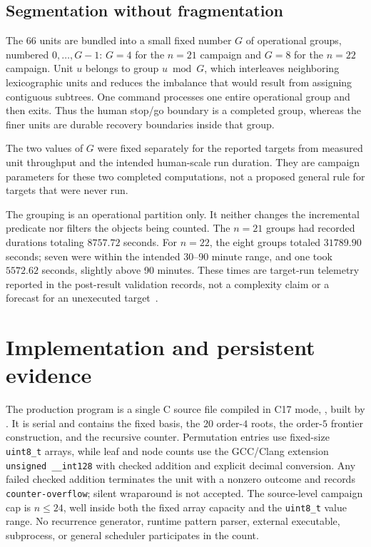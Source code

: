 \documentclass[11pt]{article}
\theoremstyle{definition}
\theoremstyle{remark}
\begin{document}
\subsection{Segmentation without fragmentation}
\label{subsec:groups}

The 66 units are bundled into a small fixed number $G$ of operational groups,
numbered $0,\ldots,G-1$:
$G=4$ for the $n=21$ campaign and $G=8$ for the $n=22$ campaign.  Unit $u$
belongs to group $u\bmod G$, which interleaves neighboring lexicographic units
and reduces the imbalance that would result from assigning contiguous
subtrees.  One command processes one entire operational group and then exits.
Thus the human stop/go boundary is a completed group, whereas the finer units
are durable recovery boundaries inside that group.

The two values of $G$ were fixed separately for the reported targets from
measured unit throughput and the intended human-scale run duration.  They are
campaign parameters for these two completed computations, not a proposed
general rule for targets that were never run.

The grouping is an operational partition only.  It neither changes the
incremental predicate nor filters the objects being counted.  The $n=21$
groups had recorded durations totaling $8757.72$ seconds.  For $n=22$, the
eight groups totaled $31789.90$ seconds; seven were within the intended
30--90 minute range, and one took $5572.62$ seconds, slightly above 90
minutes.  These times are target-run telemetry reported in the post-result
validation records, not a complexity claim or a forecast for an unexecuted
target~\cite{cortiA369431Package2026}.

\section{Implementation and persistent evidence}
\label{sec:implementation}

The production program is a single C source file compiled in C17 mode,
, built by .  It is serial and contains
the fixed basis, the 20 order-$4$ roots, the order-$5$ frontier construction,
and the recursive counter.  Permutation entries use fixed-size
\texttt{uint8\_t} arrays, while leaf and node counts use
the GCC/Clang extension \texttt{unsigned \_\_int128} with checked addition
and explicit decimal conversion.  Any failed checked addition terminates the
unit with a nonzero outcome and records \texttt{counter-overflow}; silent
wraparound is not accepted.  The source-level campaign cap is $n\leq24$, well
inside both the fixed array capacity and the \texttt{uint8\_t} value range.
No recurrence generator, runtime pattern
parser, external executable, subprocess, or general scheduler participates
in the count.
\end{document}
